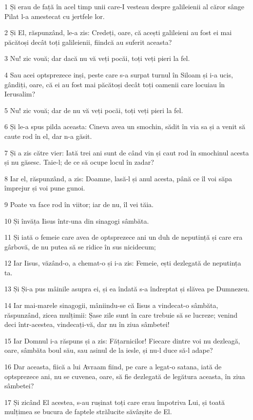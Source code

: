 \par 1 Și erau de față în acel timp unii care-I vesteau despre galileienii al căror sânge Pilat l-a amestecat cu jertfele lor.
\par 2 Și El, răspunzând, le-a zis: Credeți, oare, că acești galileieni au fost ei mai păcătoși decât toți galileienii, fiindcă au suferit aceasta?
\par 3 Nu! zic vouă; dar dacă nu vă veți pocăi, toți veți pieri la fel.
\par 4 Sau acei optsprezece inși, peste care s-a surpat turnul în Siloam și i-a ucis, gândiți, oare, că ei au fost mai păcătoși decât toți oamenii care locuiau în Ierusalim?
\par 5 Nu! zic vouă; dar de nu vă veți pocăi, toți veți pieri la fel.
\par 6 Și le-a spus pilda aceasta: Cineva avea un smochin, sădit în via sa și a venit să caute rod în el, dar n-a găsit.
\par 7 Și a zis către vier: Iată trei ani sunt de când vin și caut rod în smochinul acesta și nu găsesc. Taie-l; de ce să ocupe locul în zadar?
\par 8 Iar el, răspunzând, a zis: Doamne, lasă-l și anul acesta, până ce îl voi săpa împrejur și voi pune gunoi.
\par 9 Poate va face rod în viitor; iar de nu, îl vei tăia.
\par 10 Și învăța Iisus într-una din sinagogi sâmbăta.
\par 11 Și iată o femeie care avea de optsprezece ani un duh de neputință și care era gârbovă, de nu putea să se ridice în sus nicidecum;
\par 12 Iar Iisus, văzând-o, a chemat-o și i-a zis: Femeie, ești dezlegată de neputința ta.
\par 13 Și Și-a pus mâinile asupra ei, și ea îndată s-a îndreptat și slăvea pe Dumnezeu.
\par 14 Iar mai-marele sinagogii, mâniindu-se că Iisus a vindecat-o sâmbăta, răspunzând, zicea mulțimii: Șase zile sunt în care trebuie să se lucreze; venind deci într-acestea, vindecați-vă, dar nu în ziua sâmbetei!
\par 15 Iar Domnul i-a răspuns și a zis: Fățarnicilor! Fiecare dintre voi nu dezleagă, oare, sâmbăta boul său, sau asinul de la iesle, și nu-l duce să-l adape?
\par 16 Dar aceasta, fiică a lui Avraam fiind, pe care a legat-o satana, iată de optsprezece ani, nu se cuvenea, oare, să fie dezlegată de legătura aceasta, în ziua sâmbetei?
\par 17 Și zicând El acestea, s-au rușinat toți care erau împotriva Lui, și toată mulțimea se bucura de faptele strălucite săvârșite de El.
